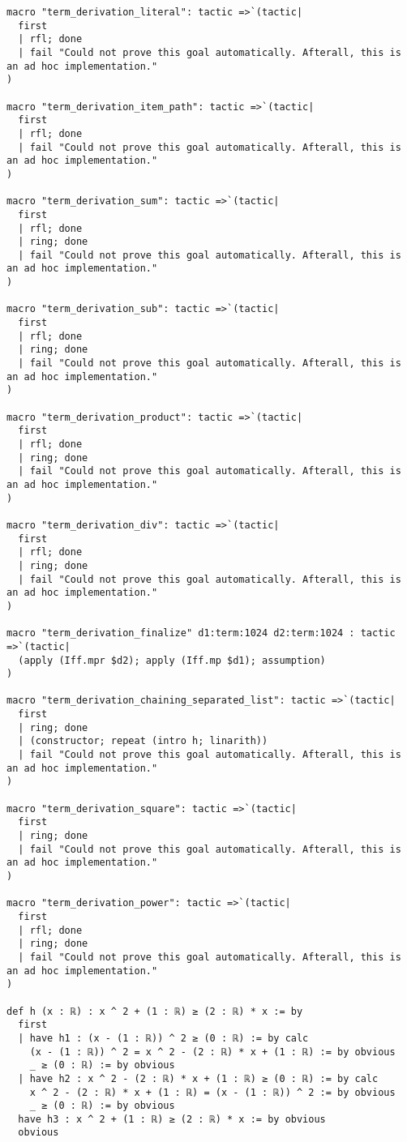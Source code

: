 \documentclass{article}
\begin{document}
\begin{tcolorbox}[colback=white!10, width=\linewidth]
\begin{lstlisting}[language=Lean4]
macro "term_derivation_literal": tactic =>`(tactic|
  first
  | rfl; done
  | fail "Could not prove this goal automatically. Afterall, this is an ad hoc implementation."
)

macro "term_derivation_item_path": tactic =>`(tactic|
  first
  | rfl; done
  | fail "Could not prove this goal automatically. Afterall, this is an ad hoc implementation."
)

macro "term_derivation_sum": tactic =>`(tactic|
  first
  | rfl; done
  | ring; done
  | fail "Could not prove this goal automatically. Afterall, this is an ad hoc implementation."
)

macro "term_derivation_sub": tactic =>`(tactic|
  first
  | rfl; done
  | ring; done
  | fail "Could not prove this goal automatically. Afterall, this is an ad hoc implementation."
)

macro "term_derivation_product": tactic =>`(tactic|
  first
  | rfl; done
  | ring; done
  | fail "Could not prove this goal automatically. Afterall, this is an ad hoc implementation."
)

macro "term_derivation_div": tactic =>`(tactic|
  first
  | rfl; done
  | ring; done
  | fail "Could not prove this goal automatically. Afterall, this is an ad hoc implementation."
)

macro "term_derivation_finalize" d1:term:1024 d2:term:1024 : tactic =>`(tactic|
  (apply (Iff.mpr $d2); apply (Iff.mp $d1); assumption)
)

macro "term_derivation_chaining_separated_list": tactic =>`(tactic|
  first
  | ring; done
  | (constructor; repeat (intro h; linarith))
  | fail "Could not prove this goal automatically. Afterall, this is an ad hoc implementation."
)

macro "term_derivation_square": tactic =>`(tactic|
  first
  | ring; done
  | fail "Could not prove this goal automatically. Afterall, this is an ad hoc implementation."
)

macro "term_derivation_power": tactic =>`(tactic|
  first
  | rfl; done
  | ring; done
  | fail "Could not prove this goal automatically. Afterall, this is an ad hoc implementation."
)

def h (x : ℝ) : x ^ 2 + (1 : ℝ) ≥ (2 : ℝ) * x := by
  first
  | have h1 : (x - (1 : ℝ)) ^ 2 ≥ (0 : ℝ) := by calc
    (x - (1 : ℝ)) ^ 2 = x ^ 2 - (2 : ℝ) * x + (1 : ℝ) := by obvious
    _ ≥ (0 : ℝ) := by obvious
  | have h2 : x ^ 2 - (2 : ℝ) * x + (1 : ℝ) ≥ (0 : ℝ) := by calc
    x ^ 2 - (2 : ℝ) * x + (1 : ℝ) = (x - (1 : ℝ)) ^ 2 := by obvious
    _ ≥ (0 : ℝ) := by obvious
  have h3 : x ^ 2 + (1 : ℝ) ≥ (2 : ℝ) * x := by obvious
  obvious

\end{lstlisting}
\end{tcolorbox}
\end{document}
